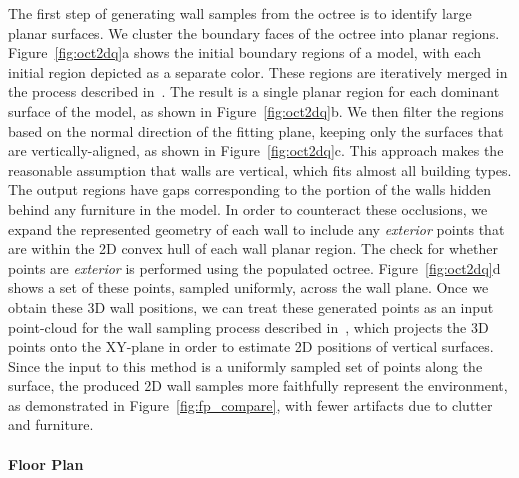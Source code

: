 \documentclass[review]{acmsiggraph}
\begin{document}
The first step of generating wall samples from the octree is to identify large planar surfaces.  We cluster the boundary faces of the octree into planar regions.  Figure~\ref{fig:oct2dq}a shows the initial boundary regions of a model, with each initial region depicted as a separate color.  These regions are iteratively merged in the process described in~\cite{Turner13}.  The result is a single planar region for each dominant surface of the model, as shown in Figure~\ref{fig:oct2dq}b.  We then filter the regions based on the normal direction of the fitting plane, keeping only the surfaces that are vertically-aligned, as shown in Figure~\ref{fig:oct2dq}c.  This approach makes the reasonable assumption that walls are vertical, which fits almost all building types.  The output regions have gaps corresponding to the portion of the walls hidden behind any furniture in the model.  In order to counteract these occlusions, we expand the represented geometry of each wall to include any {\it exterior} points that are within the 2D convex hull of each wall planar region.  The check for whether points are {\it exterior} is performed using the populated octree.  Figure~\ref{fig:oct2dq}d shows a set of these points, sampled uniformly, across the wall plane.  Once we obtain these 3D wall positions, we can treat these generated points as an input point-cloud for the wall sampling process described in~\cite{Turner14}, which projects the 3D points onto the XY-plane in order to estimate 2D positions of vertical surfaces.  Since the input to this method is a uniformly sampled set of points along the surface, the produced 2D wall samples more faithfully represent the environment, as demonstrated in Figure~\ref{fig:fp_compare}, with fewer artifacts due to clutter and furniture.

\paragraph*{Floor Plan}
\label{pg:floorplan}
\end{document}
